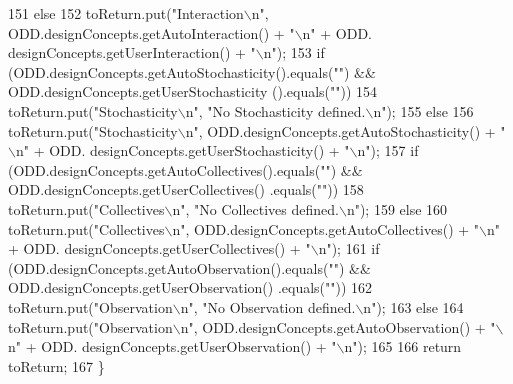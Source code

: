 \begin{DoxyCode}
151         \textcolor{keywordflow}{else}
152             toReturn.put(\textcolor{stringliteral}{"Interaction\(\backslash\)n"}, ODD.designConcepts.getAutoInteraction() + \textcolor{stringliteral}{"\(\backslash\)n"} + ODD.
      designConcepts.getUserInteraction() + \textcolor{stringliteral}{"\(\backslash\)n"});
153         \textcolor{keywordflow}{if} (ODD.designConcepts.getAutoStochasticity().equals(\textcolor{stringliteral}{""}) && ODD.designConcepts.getUserStochasticity
      ().equals(\textcolor{stringliteral}{""}))
154             toReturn.put(\textcolor{stringliteral}{"Stochasticity\(\backslash\)n"}, \textcolor{stringliteral}{"No Stochasticity defined.\(\backslash\)n"});
155         \textcolor{keywordflow}{else}
156             toReturn.put(\textcolor{stringliteral}{"Stochasticity\(\backslash\)n"}, ODD.designConcepts.getAutoStochasticity() + \textcolor{stringliteral}{"\(\backslash\)n"} + ODD.
      designConcepts.getUserStochasticity() + \textcolor{stringliteral}{"\(\backslash\)n"});
157         \textcolor{keywordflow}{if} (ODD.designConcepts.getAutoCollectives().equals(\textcolor{stringliteral}{""}) && ODD.designConcepts.getUserCollectives()
      .equals(\textcolor{stringliteral}{""}))
158             toReturn.put(\textcolor{stringliteral}{"Collectives\(\backslash\)n"}, \textcolor{stringliteral}{"No Collectives defined.\(\backslash\)n"});
159         \textcolor{keywordflow}{else}
160             toReturn.put(\textcolor{stringliteral}{"Collectives\(\backslash\)n"}, ODD.designConcepts.getAutoCollectives() + \textcolor{stringliteral}{"\(\backslash\)n"} + ODD.
      designConcepts.getUserCollectives() + \textcolor{stringliteral}{"\(\backslash\)n"});
161         \textcolor{keywordflow}{if} (ODD.designConcepts.getAutoObservation().equals(\textcolor{stringliteral}{""}) && ODD.designConcepts.getUserObservation()
      .equals(\textcolor{stringliteral}{""}))
162             toReturn.put(\textcolor{stringliteral}{"Observation\(\backslash\)n"}, \textcolor{stringliteral}{"No Observation defined.\(\backslash\)n"});
163         \textcolor{keywordflow}{else}
164             toReturn.put(\textcolor{stringliteral}{"Observation\(\backslash\)n"}, ODD.designConcepts.getAutoObservation() + \textcolor{stringliteral}{"\(\backslash\)n"} + ODD.
      designConcepts.getUserObservation() + \textcolor{stringliteral}{"\(\backslash\)n"});
165         
166         \textcolor{keywordflow}{return} toReturn;
167     \}
\end{DoxyCode}


